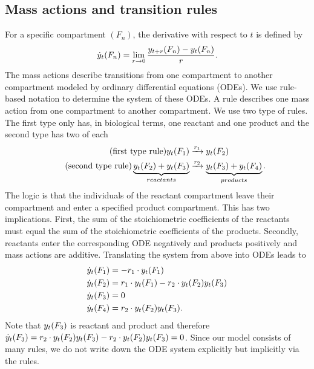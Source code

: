 \subsection{Mass actions and transition rules}
For a specific compartment $(F_n)$, the derivative with respect to $t$ is defined by
\begin{align*}
\dot{y}_t(F_n) = \lim_{r \to 0} \frac{y_{t+r}(F_n) - y_{t}(F_n)}{r}.
\end{align*}
The mass actions describe transitions from one compartment to another compartment modeled by ordinary differential equations (ODEs). We use rule-based notation to determine the system of these ODEs. A rule describes one mass action from one compartment to another compartment. We use two type of rules. The first type only has, in biological terms, one reactant and one product and the second type has two of each
\begin{align*}
	\tag{first type rule}
	\label{eq:first_type_rule}
	y_t(F_1) &\xrightarrow{r_1} y_t(F_2) \\
	\tag{second type rule} \label{eq:second_type_rule}
	\underbrace{y_t(F_2) + y_t(F_3)}_{reactants} &\xrightarrow{r_2} \underbrace{y_t(F_3) + y_t(F_4)}_{products}.
\end{align*}
The logic is that the individuals of the reactant compartment leave their compartment and enter a specified product compartment. This has two implications. First, the sum of the stoichiometric coefficients of the reactants must equal the sum of the stoichiometric coefficients of the products. Secondly, reactants enter the corresponding ODE negatively and products positively and mass actions are additive. Translating the system from above into ODEs leads to
\begin{align*}
	\dot{y}_t(F_1) &= - r_1 \cdot y_t(F_1) \\
	\dot{y}_t(F_2) &= r_1 \cdot y_t(F_1) - r_2 \cdot y_t(F_2) y_t(F_3) \\
	\dot{y}_t(F_3) &= 0 \\
	\dot{y}_t(F_4) &= r_2 \cdot y_t(F_2) y_t(F_3) .
\end{align*} 
Note that $y_t(F_3)$ is reactant and product and therefore $\dot{y}_t(F_3) = r_2 \cdot y_t(F_2) y_t(F_3) - r_2 \cdot y_t(F_2) y_t(F_3) = 0$.
Since our model consists of many rules, we do not write down the ODE system explicitly but implicitly via the rules.
 
